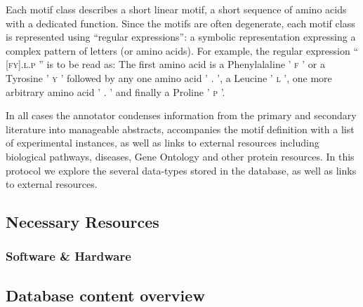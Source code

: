 \documentclass[12pt]{article}
\newcounter{proto}
\newcommand\motif[1]{%
    \textsc{\lowercase{#1}}%
}
\begin{document}
	Each motif class describes a short linear motif, a short sequence of amino acids
	with a dedicated function. Since the motifs are often degenerate, each motif
	class is represented using ``regular expressions'': a symbolic representation
	expressing a complex pattern of letters (or amino acids). For example, the
	regular expression ``\motif{[FY].L.P}'' is to be read as: The first amino acid
	is a Phenylalaline '\motif{F}' or a Tyrosine '\motif{Y}' followed by any one
	amino acid '\motif{.}', a Leucine '\motif{L}', one more arbitrary amino acid
	'\motif{.}' and finally a Proline '\motif{P}'.

	In all cases the annotator condenses information from the primary and secondary
	literature into manageable abstracts, accompanies the motif definition with
	a list of experimental instances, as well as links to external resources including
	biological pathways, diseases, Gene Ontology and other protein resources. In
	this protocol we explore the several data-types stored in the database, as well
	as links to external resources.

	\subsection*{Necessary Resources}
	\subsubsection*{Software \& Hardware}
	


	\subsection*{Database content overview}%
	\label{subsec:explore_content_database}%
\end{document}
